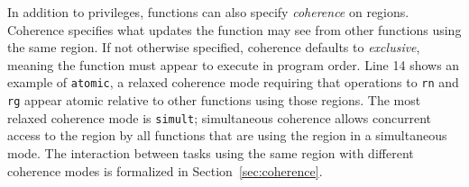 In addition to privileges, functions can also specify {\em coherence}
on regions.  Coherence specifies what updates the function may
see from other functions using the same region.  If not otherwise
specified, coherence defaults to {\em exclusive}, meaning the
function must appear to execute in program order.  Line 14 shows
an example of {\tt atomic}, a relaxed coherence mode requiring
that operations to {\tt rn} and {\tt rg} appear atomic relative
to other functions using those regions.  The most relaxed coherence
mode is {\tt simult}; simultaneous coherence allows concurrent access 
to the region by all functions that are using the region
in a simultaneous mode.  The interaction between tasks using the same
region with different coherence
modes is formalized in Section~\ref{sec:coherence}.


